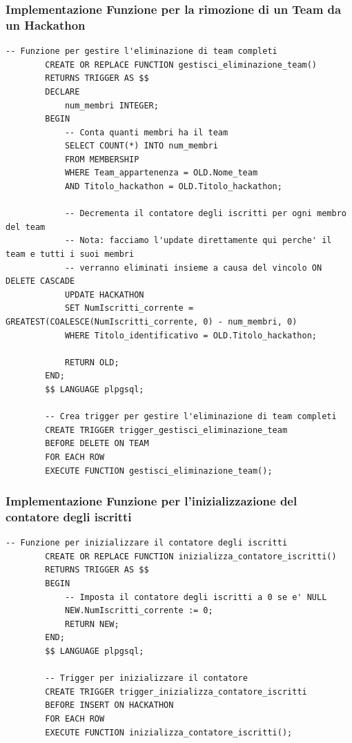 \documentclass[a4paper, 11pt]{article}
\begin{document}
	\subsubsection{Implementazione Funzione per la rimozione di un Team da un Hackathon}
	\begin{lstlisting}[style=sqlstyle]
		-- Funzione per gestire l'eliminazione di team completi
		CREATE OR REPLACE FUNCTION gestisci_eliminazione_team()
		RETURNS TRIGGER AS $$
		DECLARE
			num_membri INTEGER;
		BEGIN
			-- Conta quanti membri ha il team
			SELECT COUNT(*) INTO num_membri
			FROM MEMBERSHIP
			WHERE Team_appartenenza = OLD.Nome_team
			AND Titolo_hackathon = OLD.Titolo_hackathon;
			
			-- Decrementa il contatore degli iscritti per ogni membro del team
			-- Nota: facciamo l'update direttamente qui perche' il team e tutti i suoi membri
			-- verranno eliminati insieme a causa del vincolo ON DELETE CASCADE
			UPDATE HACKATHON
			SET NumIscritti_corrente = GREATEST(COALESCE(NumIscritti_corrente, 0) - num_membri, 0)
			WHERE Titolo_identificativo = OLD.Titolo_hackathon;
			
			RETURN OLD;
		END;
		$$ LANGUAGE plpgsql;
		
		-- Crea trigger per gestire l'eliminazione di team completi
		CREATE TRIGGER trigger_gestisci_eliminazione_team
		BEFORE DELETE ON TEAM
		FOR EACH ROW
		EXECUTE FUNCTION gestisci_eliminazione_team();
	\end{lstlisting}
	\subsubsection{Implementazione Funzione per l'inizializzazione del contatore degli iscritti}
	\begin{lstlisting}[style=sqlstyle]
		-- Funzione per inizializzare il contatore degli iscritti
		CREATE OR REPLACE FUNCTION inizializza_contatore_iscritti()
		RETURNS TRIGGER AS $$
		BEGIN
			-- Imposta il contatore degli iscritti a 0 se e' NULL
			NEW.NumIscritti_corrente := 0;
			RETURN NEW;
		END;
		$$ LANGUAGE plpgsql;
		
		-- Trigger per inizializzare il contatore
		CREATE TRIGGER trigger_inizializza_contatore_iscritti
		BEFORE INSERT ON HACKATHON
		FOR EACH ROW
		EXECUTE FUNCTION inizializza_contatore_iscritti();
	\end{lstlisting}
	
\end{document}
